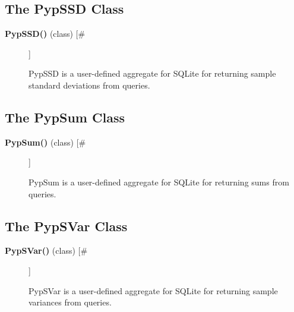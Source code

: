 \subsection*{The PypSSD Class}
\begin{description}
\item[\textbf{PypSSD()} (class) [\#]
]
\par PypSSD is a user-defined aggregate for SQLite for returning sample standard deviations
from queries.

\end{description}
\subsection*{The PypSum Class}
\begin{description}
\item[\textbf{PypSum()} (class) [\#]
]
\par PypSum is a user-defined aggregate for SQLite for returning sums from queries.

\end{description}
\subsection*{The PypSVar Class}
\begin{description}
\item[\textbf{PypSVar()} (class) [\#]
]
\par PypSVar is a user-defined aggregate for SQLite for returning sample variances
from queries.

\end{description}
